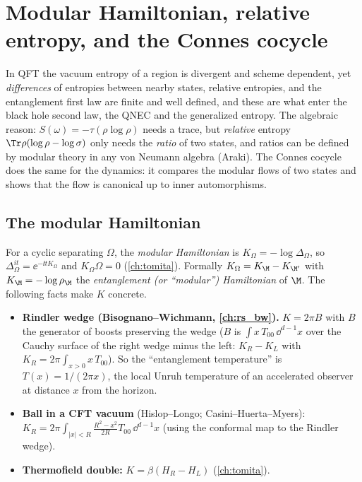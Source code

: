 \chapter{Modular Hamiltonian, relative entropy, and the Connes cocycle}\label{ch:modham}

\begin{physmotiv}
In QFT the vacuum entropy of a region is divergent and scheme dependent, yet \emph{differences} of entropies between nearby states, relative entropies, and the entanglement first law are finite and well defined, and these are what enter the black hole second law, the QNEC and the generalized entropy. The algebraic reason: $S(\omega)=-\tau(\rho\log\rho)$ needs a trace, but \emph{relative} entropy $\Tr\rho(\log\rho-\log\sigma)$ only needs the \emph{ratio} of two states, and ratios can be defined by modular theory in any von Neumann algebra (Araki). The Connes cocycle does the same for the dynamics: it compares the modular flows of two states and shows that the flow is canonical up to inner automorphisms.
\end{physmotiv}

\section{The modular Hamiltonian}

For a cyclic separating $\Omega$, the \emph{modular Hamiltonian} is $K_\Omega=-\log\Delta_\Omega$, so $\Delta_\Omega^{it}=\ee^{-\ii tK_\Omega}$ and $K_\Omega\Omega=0$ (\cref{ch:tomita}). Formally $K_\Omega=K_\M-K_{\M'}$ with $K_\M=-\log\rho_\M$ the \emph{entanglement (or ``modular'') Hamiltonian} of $\M$. The following facts make $K$ concrete.

\begin{itemize}
\item \textbf{Rindler wedge (Bisognano--Wichmann, \cref{ch:rs_bw}).} $K=2\pi B$ with $B$ the generator of boosts preserving the wedge ($B$ is $\int x\,T_{00}\,\dd^{d-1}x$ over the Cauchy surface of the right wedge minus the left: $K_R-K_L$ with $K_R=2\pi\int_{x>0}x\,T_{00}$). So the ``entanglement temperature'' is $T(x)=1/(2\pi x)$, the local Unruh temperature of an accelerated observer at distance $x$ from the horizon.
\item \textbf{Ball in a CFT vacuum} (Hislop--Longo; Casini--Huerta--Myers): $K_R=2\pi\int_{|x|<R}\frac{R^2-x^2}{2R}T_{00}\,\dd^{d-1}x$ (using the conformal map to the Rindler wedge).
\item \textbf{Thermofield double:} $K=\beta(H_R-H_L)$ (\cref{ch:tomita}).
\end{itemize}

